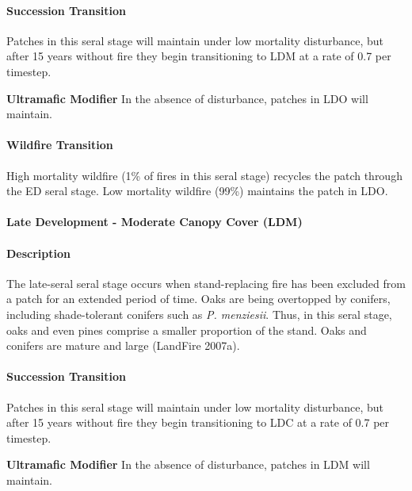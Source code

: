 \paragraph*{Succession Transition} Patches in this seral stage will maintain under low mortality disturbance, but after 15 years without fire they begin transitioning to LDM at a rate of 0.7 per timestep. 
\begin{adjustwidth}{2cm}{}

\medskip
\textbf{Ultramafic Modifier}  In the absence of disturbance, patches in LDO will maintain.

\end{adjustwidth}
\paragraph*{Wildfire Transition}
High mortality wildfire (1\% of fires in this seral stage) recycles the patch through the ED seral stage. Low mortality wildfire (99\%) maintains the patch in LDO.

\noindent\hrulefill

\paragraph*{Late Development - Moderate Canopy Cover (LDM)}

\paragraph*{Description} The late-seral seral stage occurs when stand-replacing fire has been excluded from a patch for an extended period of time. Oaks are being overtopped by conifers, including shade-tolerant conifers such as \emph{P. menziesii}. Thus, in this seral stage, oaks and even pines comprise a smaller proportion of the stand. Oaks and conifers are mature and large (LandFire 2007a). 

\paragraph*{Succession Transition} Patches in this seral stage will maintain under low mortality disturbance, but after 15 years without fire they begin transitioning to LDC at a rate of 0.7 per timestep.
\begin{adjustwidth}{2cm}{}

\medskip
\textbf{Ultramafic Modifier}  In the absence of disturbance, patches in LDM will maintain.

\end{adjustwidth}
